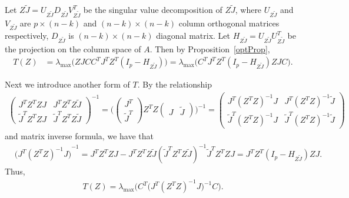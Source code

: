\documentclass[review]{elsarticle}
\theoremstyle{plain}
\theoremstyle{definition}
\theoremstyle{remark}
\begin{document}
Let $Z\tilde{J}=U_{Z\tilde{J}}D_{Z\tilde{J}}V_{Z\tilde{J}}^T$ be the singular value decomposition of $Z\tilde{J}$, where $U_{Z\tilde{J}}$ and $V_{Z\tilde{J}}$ are $p\times (n-k)$ and $(n-k)\times(n-k)$ column orthogonal matrices respectively, $D_{Z\tilde{J}}$ is $(n-k)\times (n-k)$ diagonal matrix.
Let $H_{Z\tilde{J}}=U_{Z\tilde{J}}U_{Z\tilde{J}}^T$ be the projection on the column space of $A$.
Then by Proposition~\ref{optProp}, 
\begin{equation}\label{statisticForm1}
\begin{aligned}
    T(Z)&=\lambda_{\max}\big(ZJCC^TJ^TZ^T (I_p-
    H_{Z\tilde{J}})
    \big)
    =\lambda_{\max}\big(C^TJ^TZ^T (I_p-
    H_{Z\tilde{J}}
    )ZJC\big).
\end{aligned}
\end{equation}

Next we introduce another form of $T$.
By the relationship
\begin{equation*}
    \begin{aligned}
        \begin{pmatrix}
            J^T Z^T ZJ & J^T Z^T Z\tilde{J}\\
            \tilde{J}^T Z^T ZJ & \tilde{J}^T Z^T Z \tilde{J}
        \end{pmatrix}^{-1}
        =
        \Big(
        \begin{pmatrix}
            J^T\\
            \tilde{J}^T
        \end{pmatrix}
        Z^T Z
        \begin{pmatrix}
            J&\tilde{J}
        \end{pmatrix}
        \Big)^{-1}
        =
        \begin{pmatrix}
            J^T {(Z^T Z)}^{-1}J & J^T {(Z^T Z)}^{-1}\tilde{J}\\
            \tilde{J}^T {(Z^T Z)}^{-1}J & \tilde{J}^T {(Z^T Z)}^{-1} \tilde{J}
        \end{pmatrix}
    \end{aligned}
\end{equation*}
and matrix inverse formula, we have that
\begin{equation*}
    \begin{aligned}
        &{\big( J^T {(Z^T Z)}^{-1}J \big)}^{-1}
        =J^T Z^T ZJ - J^T Z^T Z\tilde{J}{(\tilde{J}^T Z^T Z \tilde{J})}^{-1}
            \tilde{J}^T Z^T ZJ 
        = J^T Z^T( I_p- H_{Z\tilde{J}}) ZJ.
    \end{aligned}
\end{equation*}
Thus, 
\begin{equation}\label{statisticForm2}
    \begin{aligned}
        T(Z)=
        \lambda_{\max}\Big(C^T\big( J^T (Z^T Z)^{-1}J \big)^{-1}C\Big).
    \end{aligned}
\end{equation}
\end{document}
